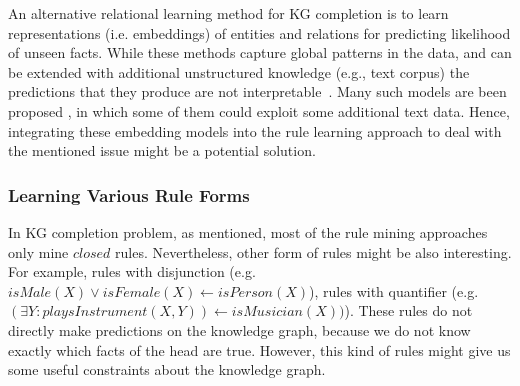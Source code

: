 An alternative relational learning method for KG completion is to learn representations (i.e. embeddings) of entities and relations for predicting likelihood of unseen facts. While these methods capture global patterns in the data, and can be extended with additional unstructured knowledge (e.g., text corpus) the predictions that they produce are not interpretable~\cite{Shakerin2018}. Many such models are been proposed \cite{Wang2017}, in which some of them could exploit some additional text data. Hence, integrating these embedding models into the rule learning approach to deal with the mentioned issue might be a potential solution. 
\subsubsection{Learning Various Rule Forms}
In KG completion problem, as mentioned, most of the rule mining approaches only mine $closed$ rules. Nevertheless, other form of rules might be also interesting. For example, rules with disjunction (e.g. $isMale(X) \vee isFemale(X) \leftarrow isPerson(X)$), rules with quantifier (e.g. $(\exists Y: playsInstrument(X, Y)) \leftarrow isMusician(X))$). These rules do not directly make predictions on the knowledge graph, because we do not know exactly which facts of the head are true. However, this kind of rules might give us some useful constraints about the knowledge graph.
